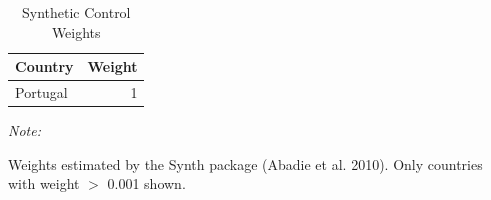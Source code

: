 \begin{table}[!h]
\centering
\caption{\label{tab:tab2}Synthetic Control Weights}
\centering
\begin{threeparttable}
\begin{tabular}[t]{lr}
\toprule
Country & Weight\\
\midrule
Portugal & 1\\
\bottomrule
\end{tabular}
\begin{tablenotes}
\item \textit{Note: } 
\item Weights estimated by the Synth package (Abadie et al. 2010). Only countries with weight $>$ 0.001 shown.
\end{tablenotes}
\end{threeparttable}
\end{table}

